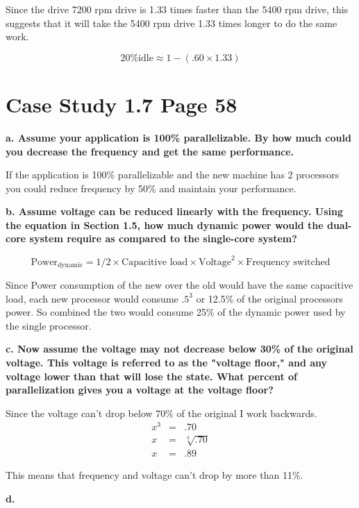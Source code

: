 \documentclass[12pt,twoside,letterpaper]{article}
\begin{document}
Since the drive 7200 rpm drive is 1.33 times faster than the 5400 rpm drive, this suggests that it will take the 5400 rpm drive 1.33 times longer to do the same work.

$$\textrm{20\% idle} \approx 1 - (.60 \times 1.33)$$

\section*{Case Study 1.7 Page 58}
\textbf{a. Assume your application is 100\% parallelizable. By how much could you decrease the frequency and get the same performance.}

If the application is 100\% parallelizable and the new machine has 2 processors you could reduce frequency by 50\% and maintain your performance.

\textbf{b. Assume voltage can be reduced linearly with the frequency. Using the equation in Section 1.5, how much dynamic power would the dual-core system require as compared to the single-core system?}

\[ \textrm{Power}_\textrm{dynamic} = 1/2 \times \textrm{Capacitive load} \times \textrm{Voltage}^2 \times \textrm{Frequency switched} \]

Since Power consumption of the new over the old would have the same capacitive load, each new processor would consume $.5^3$ or 12.5\% of the original processors power. So combined the two would consume 25\% of the dynamic power used by the single processor.

\textbf{c. Now assume the voltage may not decrease below 30\% of the original voltage. This voltage is referred to as the "voltage floor," and any voltage lower than that will lose the state. What percent of parallelization gives you a voltage at the voltage floor?}

Since the voltage can't drop below 70\% of the original I work backwards.
$$ \begin{array}{rcl}
x^3 & = & .70 \\
x & = & \sqrt[3]{.70} \\
x & = & .89
\end{array}$$

This means that frequency and voltage can't drop by more than 11\%.

\textbf{d. }
\end{document}
